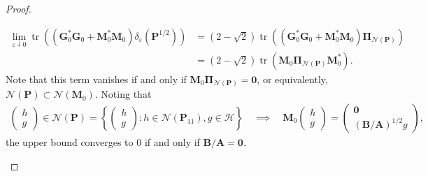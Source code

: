 \documentclass[noinfoline]{imsart}\setcounter{tocdepth}{2}
\newcommand{\m}[1]{\mathbf{#1}}
\renewcommand{\c}[1]{\mathcal{#1}}
\DeclareMathOperator{\tr}{tr}
\theoremstyle{plain}
\begin{document}
\begin{proof}
\begin{enumerate}[leftmargin = *]
\begin{align*}
    \lim_{\varepsilon \downarrow 0} \tr \left((\m{G}_{0}^{*} \m{G}_{0} + \m{M}_{0}^{*} \m{M}_{0}) \delta_{\varepsilon}(\m{P}^{1/2}) \right) &= (2-\sqrt{2}) \tr \left((\m{G}_{0}^{*} \m{G}_{0} + \m{M}_{0}^{*} \m{M}_{0}) \m{\Pi}_{\c{N}(\m{P})} \right) \\
    &= (2-\sqrt{2}) \tr (\m{M}_{0} \m{\Pi}_{\c{N}(\m{P})} \m{M}_{0}^{*}).
\end{align*}
Note that this term vanishes if and only if $\m{M}_{0} \m{\Pi}_{\c{N}(\m{P})} = \m{0}$, or equivalently, $\c{N}(\m{P}) \subset \c{N}(\m{M}_{0})$. Noting that
\begin{align*}
    \left(
    \begin{array}{c}
        h \\
        \hline
        g 
    \end{array}
    \right) \in \c{N}(\m{P}) = \left\{ \left(
    \begin{array}{c}
        h \\
        \hline
        g 
    \end{array}
    \right) : h \in \c{N}(\m{P}_{11}), g \in \c{H} \right\} \quad \implies \quad \m{M}_{0} \left(
    \begin{array}{c}
        h \\
        \hline
        g 
    \end{array}
    \right) =
    \left(
    \begin{array}{c}
        \m{0} \\
        \hline
        (\m{B}/\m{A})^{1/2} g 
    \end{array}
    \right),
\end{align*} 
the upper bound converges to $0$ if and only if $\m{B}/\m{A} = \m{0}$.


\end{enumerate}
\end{proof}
\end{document}
